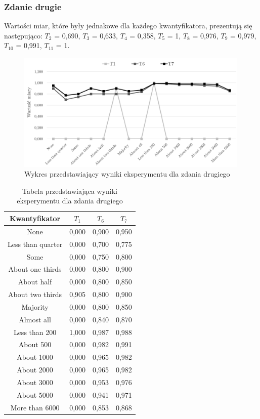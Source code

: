 \documentclass{classrep}
\begin{document}
\clearpage



\subsubsection{Zdanie drugie}

Wartości miar, które były jednakowe dla każdego kwantyfikatora, prezentują się następująco:
$T_2$ = 0,690, $T_3$ = 0,633, $T_4$ = 0,358, $T_5$ = 1, $T_8$ = 0,976, $T_9$ = 0,979, $T_{10}$ = 0,991, $T_{11}$ = 1.

\begin{figure}[H]
	\centering
	\includegraphics[width=0.99\textwidth]{Pictures/ResultCharts/Eks1_2.png}
	\caption{Wykres przedstawiający wyniki eksperymentu dla zdania drugiego}
\end{figure}

\begin{table}[H]
	\centering
	\begin{tabular}{c c c c} 
		\hline
		\textbf{Kwantyfikator}  & \textbf{$T_1$} & \textbf{$T_6$} & \textbf{$T_7$}\\ [0.5ex] 
		\hline
		\hline
None	&	0,000	&	0,900	&	0,950	\\
Less than quarter	&	0,000	&	0,700	&	0,775	\\
Some 	&	0,000	&	0,750	&	0,800	\\
About one thirds 	&	0,000	&	0,800	&	0,900	\\
About half 	&	0,000	&	0,800	&	0,850	\\
About two thirds 	&	0,905	&	0,800	&	0,900	\\
Majority 	&	0,000	&	0,800	&	0,850	\\
Almost all	&	0,000	&	0,840	&	0,870	\\
Less than 200	&	1,000	&	0,987	&	0,988	\\
About 500	&	0,000	&	0,982	&	0,991	\\
About 1000	&	0,000	&	0,965	&	0,982	\\
About 2000	&	0,000	&	0,965	&	0,982	\\
About 3000	&	0,000	&	0,953	&	0,976	\\
About 5000	&	0,000	&	0,941	&	0,971	\\
More than 6000	&	0,000	&	0,853	&	0,868	\\
		\hline
	\end{tabular}
	\caption{Tabela przedstawiająca wyniki eksperymentu dla zdania drugiego}
\end{table}
\end{document}
